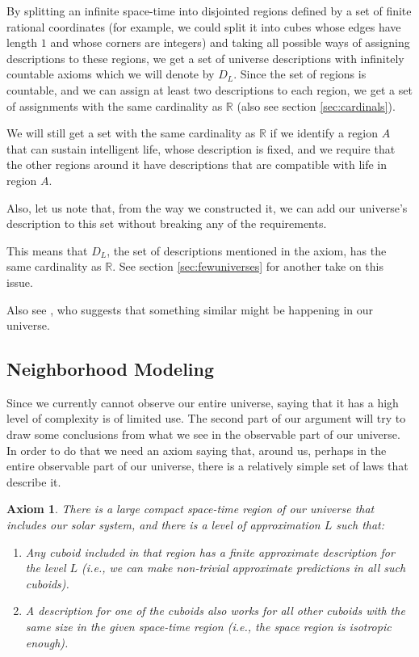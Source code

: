 \documentclass[a4paper
,draft
]{article}
\def\reale{\mathbb{R}}
\def\descriptions{D_L}
\newtheorem{axiom}{Axiom}
\begin{document}
By splitting an infinite space-time
into disjointed regions defined by a set of finite rational coordinates
(for example, we could split it into cubes whose edges have length $1$ and whose
corners are integers)
and taking all possible ways of assigning descriptions to these regions,
we get a set of universe descriptions with infinitely countable axioms
which we will denote by $\descriptions$.
Since the set of regions is countable, and we can assign at least two
descriptions to each region, we get a set of assignments with the same
cardinality as $\reale$ (also see section \ref{sec:cardinals}).

We will still get a set with the same cardinality as $\reale$ if we identify a region $A$ that can sustain intelligent life,
whose description is fixed,
and we require that the other regions around it have descriptions that are compatible with life
in region $A$.

Also, let us note that, from the way we constructed it, we can add our
universe's description to this set without breaking any of the requirements.

This means that $\descriptions$, the set of descriptions mentioned in the axiom,
has the same cardinality as $\reale$. See
section \ref{sec:fewuniverses} for another take on this issue.

Also see \parencite{Manson2003}, who suggests that something similar
might be happening in our universe.

\subsection{Neighborhood Modeling}

Since we currently cannot observe our entire universe, saying that it has a
high level of complexity is of limited use.
The second part of our argument will try to draw some conclusions from
what we see in the observable part of our universe.
In order to do that we need an axiom saying that, around us, perhaps in the
entire observable part of our universe, there is a relatively simple
set of laws that describe it.

\begin{axiom}\label{ax:finiteneighbourhood}
  There is a large compact space-time region of our universe that
  includes our solar
  system, and there is a level of approximation $L$ such that:
  \begin{enumerate}
    \item Any cuboid included in that region has a finite approximate
          description for the level $L$ (i.e., we can make non-trivial
          approximate predictions in all such cuboids).
    \item A description for one of the cuboids also works for all other
          cuboids with the same size in the given space-time region
          (i.e., the space region is isotropic enough).
  \end{enumerate}
\end{axiom}
\end{document}
